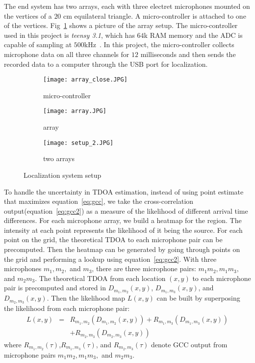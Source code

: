 The end system has two arrays, each with three electret microphones mounted on the vertices of a $20$ cm equilateral triangle. A micro-controller is attached to one of the vertices. Fig~\ref{fig:setup_array} shows a picture of the array setup. The micro-controller used in this project is \emph{teensy 3.1}, which has $64$k RAM memory and the ADC is capable of sampling at $500$kHz~\cite{tdoa:micloc, sys:teensy}. In this project, the micro-controller collects microphone data on all three channels for $12$ milliseconds and then sends the recorded data to a computer through the USB port for localization. 

\begin{figure}[]
  \centering
  \begin{subfigure}[]{.48\textwidth}
    \texttt{[image: array\_close.JPG]}
    \caption{micro-controller}
  \end{subfigure}
  \begin{subfigure}[]{.48\textwidth}
    \texttt{[image: array.JPG]}
    \caption{array}
  \end{subfigure}
  \begin{subfigure}[]{.48\textwidth}
    \texttt{[image: setup\_2.JPG]}
    \caption{two arrays}
  \end{subfigure}
  \caption{Localization system setup}
  \label{fig:setup_array}
\end{figure}

To handle the uncertainty in TDOA estimation, instead of using point estimate that maximizes equation~\ref{eq:gcc}, we take the cross-correlation output(equation~\ref{eq:gcc2}) as a measure of the likelihood of different arrival time differences. For each microphone array, we build a heatmap for the region. The intensity at each point represents the likelihood of it being the source. For each point on the grid, the theoretical TDOA to each microphone pair can be precomputed. Then the heatmap can be generated by going through points on the grid and performing a lookup using equation~\ref{eq:gcc2}. With three microphones $m_1,m_2,$ and $m_3$, there are three microphone pairs: $m_1m_2,m_1m_3,$ and $m_2m_3$. The theoretical TDOA from each location $(x,y)$ to each microphone pair is precomputed and stored in $D_{m_1,m_2}(x,y)$, $D_{m_1,m_3}(x,y)$, and $D_{m_2,m_3}(x,y)$. Then the likelihood map $L(x,y)$ can be built by superposing the likelihood from each microphone pair:
\begin{eqnarray*}
L(x,y) &=& R_{m_1,m_2}(D_{m_1,m_2}(x,y)) + R_{m_1,m_3}(D_{m_1,m_3}(x,y)) \\
 & & +R_{m_2,m_3}(D_{m_2,m_3}(x,y)) 
\end{eqnarray*}
where $R_{m_1,m_2}(\tau)$,$R_{m_1,m_3}(\tau)$, and $R_{m_2,m_3}(\tau)$ denote GCC output from microphone pairs $m_1m_2,m_1m_3,$ and $m_2m_3$.


